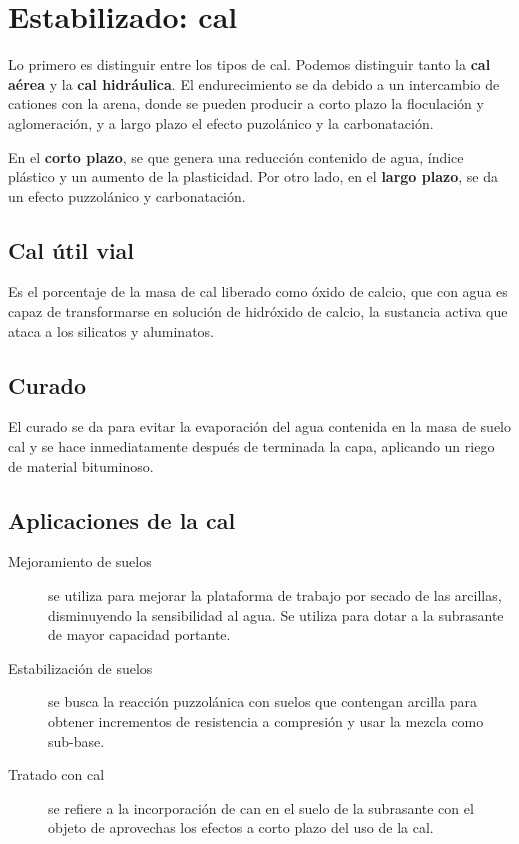 \documentclass[../main.tex]{subfiles}
\begin{document}
\section{Estabilizado: cal}

Lo primero es distinguir entre los tipos de cal. Podemos distinguir tanto la 
\textbf{cal aérea} y la \textbf{cal hidráulica}. El endurecimiento se da 
debido a un intercambio de cationes con la arena, donde se pueden producir
a corto plazo la floculación y aglomeración, y a largo plazo el efecto 
puzolánico y la carbonatación.

En el \textbf{corto plazo}, se que genera una reducción contenido de agua,
índice plástico y un aumento de la plasticidad. Por otro lado, en el
\textbf{largo plazo}, se da un efecto puzzolánico y carbonatación.


\subsection{Cal útil vial}

Es el porcentaje de la masa de cal liberado como óxido de calcio, que con agua
es capaz de transformarse en solución de hidróxido de calcio, la sustancia
activa que ataca a los silicatos y aluminatos.

\subsection{Curado}

El curado se da para evitar la evaporación del agua contenida en la masa
de suelo cal y se hace inmediatamente después de terminada la capa, aplicando
un riego de material bituminoso.

\subsection{Aplicaciones de la cal}

\begin{description}
  \item[Mejoramiento de suelos] se utiliza para mejorar la plataforma de 
    trabajo por secado de las arcillas, disminuyendo la sensibilidad al agua.
    Se utiliza para dotar a la subrasante de mayor capacidad portante.
  \item[Estabilización de suelos]  se busca la reacción puzzolánica con suelos
    que contengan arcilla para obtener incrementos de resistencia a compresión
    y usar la mezcla como sub-base.
  \item[Tratado con cal] se refiere a la incorporación de can en el suelo
    de la subrasante con el objeto de aprovechas los efectos a corto plazo
    del uso de la cal.
\end{description}
\end{document}
